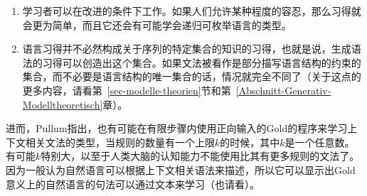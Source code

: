 \begin{enumerate}
\item 学习者可以在改进的条件下工作。如果人们允许某种程度的容忍，那么习得就会更为简单，而且它还会有可能学会递归可枚举语言的类型\citep{Wharton74a}。

\item 语言习得并不必然构成关于序列的特定集合的知识的习得，也就是说，生成语法的习得可以创造出这个集合。如果文法被看作是部分描写语言结构的约束的集合，而不必要是语言结构的唯一集合的话，情况就完全不同了（关于这点的更多内容，请看第~\ref{sec-modelle-theorien}节和第~\ref{Abschnitt-Generativ-Modelltheoretisch}章）。
\end{enumerate}

\noindent
进而，Pullum指出，也有可能在有限步骤内使用正向输入的Gold的程序来学习上下文相关文法的类型，当规则的数量有一个上限$k$的时候，其中$k$是一个任意数。
有可能$k$特别大，以至于人类大脑的认知能力不能使用比其有更多规则的文法了。
因为一般认为自然语言可以根据上下文相关语法来描述，所以它可以显示出Gold意义上的自然语言的句法可以通过文本来学习（也请看\citealp[--196]{SP2002b}）。

